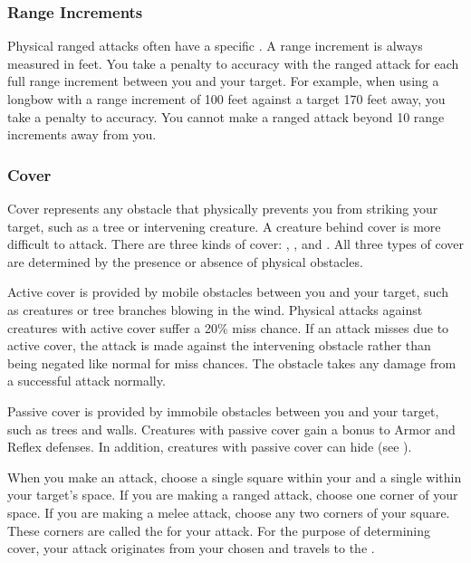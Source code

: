        \subsubsection{Range Increments}\label{Range Increments}
            Physical ranged attacks often have a specific .
            A range increment is always measured in feet.
            You take a  penalty to accuracy with the ranged attack for each full range increment between you and your target.
            For example, when using a longbow with a range increment of 100 feet against a target 170 feet away, you take a  penalty to accuracy.
            You cannot make a ranged attack beyond 10 range increments away from you.

        \subsubsection{Cover}\label{Cover}

            Cover represents any obstacle that physically prevents you from striking your target, such as a tree or intervening creature.
            A creature behind cover is more difficult to attack.
            There are three kinds of cover: , , and .
            All three types of cover are determined by the presence or absence of physical obstacles.

            \label{Active Cover} Active cover is provided by mobile obstacles between you and your target, such as creatures or tree branches blowing in the wind.
            Physical attacks against creatures with active cover suffer a 20\% miss chance.
            If an attack misses due to active cover, the attack is made against the intervening obstacle rather than being negated like normal for miss chances.
            The obstacle takes any damage from a successful attack normally.

            \label{Passive Cover} Passive cover is provided by immobile obstacles between you and your target, such as trees and walls.
            Creatures with passive cover gain a  bonus to Armor and Reflex defenses.
            In addition, creatures with passive cover can hide (see ).


            When you make an attack, choose a single square within your  and a single  within your target's space.
            If you are making a ranged attack, choose one corner of your space.
            If you are making a melee attack, choose any two corners of your square.
            These corners are called the  for your attack.
            For the purpose of determining cover, your attack originates from your chosen  and travels to the .

